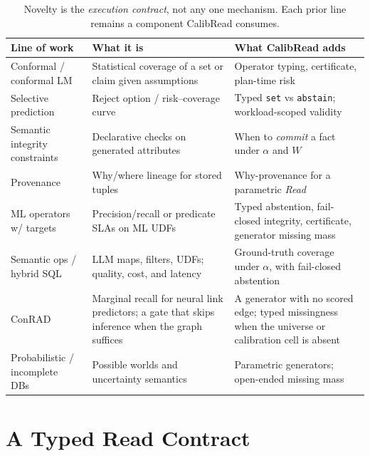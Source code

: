 \documentclass[sigconf, nonacm]{acmart}
\begin{document}
\begin{table}[t]
\caption{Novelty is the \emph{execution contract}, not any one mechanism. Each prior line remains a component CalibRead consumes.}
\label{tab:position}
\small
\begin{tabular}{@{}p{}p{}p{}@{}}
\toprule
Line of work & What it is & What CalibRead adds \\
\midrule
Conformal / conformal LM~\cite{vovk2005algorithmic,quach2024conformal,mohri2024language} & Statistical coverage of a set or claim given assumptions & Operator typing, certificate, plan-time risk \\
Selective prediction~\cite{geifman2019selectivenet,kamath2020selective} & Reject option / risk--coverage curve & Typed \texttt{set} vs \texttt{abstain}; workload-scoped validity \\
Semantic integrity constraints~\cite{lee2025sic} & Declarative checks on generated attributes & When to \emph{commit} a fact under $\alpha$ and $W$ \\
Provenance~\cite{buneman2001why,green2007provenance,widom2005trio} & Why/where lineage for stored tuples & Why-provenance for a parametric \emph{Read} \\
ML operators w/ targets~\cite{kang2020supg,lu2018probabilistic} & Precision/recall or predicate SLAs on ML UDFs & Typed abstention, fail-closed integrity, certificate, generator missing mass \\
Semantic ops / hybrid SQL~\cite{patel2025lotus,zhao2025swan,russo2026abacus,saeed2023galois} & LLM maps, filters, UDFs; quality, cost, and latency & Ground-truth coverage under $\alpha$, with fail-closed abstention \\
ConRAD~\cite{horchidan2026conrad} & Marginal recall for neural link predictors; a gate that skips inference when the graph suffices & A generator with no scored edge; typed missingness when the universe or calibration cell is absent \\
Probabilistic / incomplete DBs~\cite{imielinski1984incomplete,dalvi2007efficient,suciu2011probabilistic} & Possible worlds and uncertainty semantics & Parametric generators; open-ended missing mass \\
\bottomrule
\end{tabular}
\end{table}

\section{A Typed Read Contract}
\end{document}
